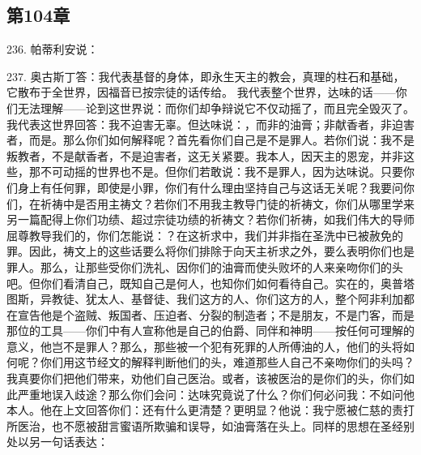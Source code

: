 
\subsection{第104章}

236. 帕蒂利安说：\par

237. 奥古斯丁答：我代表基督的身体，即永生天主的教会，真理的柱石和基础，它散布于全世界，因福音已按宗徒的话传给。 我代表整个世界，达味的话——你们无法理解——论到这世界说：而你们却争辩说它不仅动摇了，而且完全毁灭了。我代表这世界回答：我不迫害无辜。但达味说：，而非的油膏；非献香者，非迫害者，而是。那么你们如何解释呢？首先看你们自己是不是罪人。若你们说：我不是叛教者，不是献香者，不是迫害者，这无关紧要。我本人，因天主的恩宠，并非这些，那不可动摇的世界也不是。但你们若敢说：我不是罪人，因为达味说。只要你们身上有任何罪，即使是小罪，你们有什么理由坚持自己与这话无关呢？我要问你们，在祈祷中是否用主祷文？若你们不用我主教导门徒的祈祷文，你们从哪里学来另一篇配得上你们功绩、超过宗徒功绩的祈祷文？若你们祈祷，如我们伟大的导师屈尊教导我们的，你们怎能说：？在这祈求中，我们并非指在圣洗中已被赦免的罪。因此，祷文上的这些话要么将你们排除于向天主祈求之外，要么表明你们也是罪人。那么，让那些受你们洗礼、因你们的油膏而使头败坏的人来亲吻你们的头吧。但你们看清自己，既知自己是何人，也知你们如何看待自己。实在的，奥普塔图斯，异教徒、犹太人、基督徒、我们这方的人、你们这方的人，整个阿非利加都在宣告他是个盗贼、叛国者、压迫者、分裂的制造者；不是朋友，不是门客，而是那位的工具——你们中有人宣称他是自己的伯爵、同伴和神明——按任何可理解的意义，他岂不是罪人？那么，那些被一个犯有死罪的人所傅油的人，他们的头将如何呢？你们用这节经文的解释判断他们的头，难道那些人自己不亲吻你们的头吗？我真要你们把他们带来，劝他们自己医治。或者，该被医治的是你们的头，你们如此严重地误入歧途？那么你们会问：达味究竟说了什么？你们何必问我：不如问他本人。他在上文回答你们：还有什么更清楚？更明显？他说：我宁愿被仁慈的责打所医治，也不愿被甜言蜜语所欺骗和误导，如油膏落在头上。同样的思想在圣经别处以另一句话表达：\par

